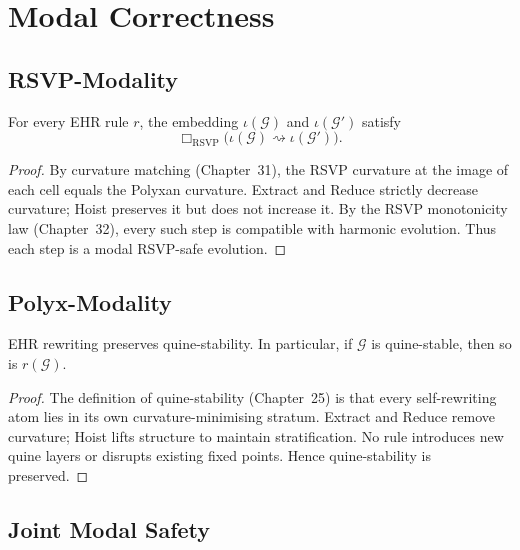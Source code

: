 \section{Modal Correctness}

\subsection{RSVP-Modality}

\begin{theorem}
\label{thm:rsvp_compatibility}
For every EHR rule $r$, the embedding $\iota(\mathcal{G})$ and
$\iota(\mathcal{G}')$ satisfy
\[
\Box_{\mathrm{RSVP}}
  \bigl(\iota(\mathcal{G}) \rightsquigarrow \iota(\mathcal{G}')\bigr).
\]
\end{theorem}

\begin{proof}
By curvature matching (Chapter~31), the RSVP curvature at the image of each
cell equals the Polyxan curvature.  
Extract and Reduce strictly decrease curvature; Hoist preserves it but does not
increase it.  
By the RSVP monotonicity law (Chapter~32), every such step is compatible with
harmonic evolution.  
Thus each step is a modal RSVP-safe evolution.
\end{proof}

\subsection{Polyx-Modality}

\begin{theorem}
\label{thm:quine_stable}
EHR rewriting preserves quine-stability.  
In particular, if $\mathcal{G}$ is quine-stable, then so is $r(\mathcal{G})$.
\end{theorem}

\begin{proof}
The definition of quine-stability (Chapter~25) is that every self-rewriting
atom lies in its own curvature-minimising stratum.  
Extract and Reduce remove curvature; Hoist lifts structure to maintain
stratification.  
No rule introduces new quine layers or disrupts existing fixed points.  
Hence quine-stability is preserved.
\end{proof}

\subsection{Joint Modal Safety}

